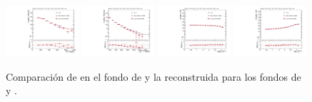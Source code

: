 \begin{figure}
  \centering
  \includegraphics[width=0.24\textwidth]{images/analysis_EWK/ZnunugCutS_100_vs_ZllgCutS_100_v192_0_met_et.pdf}
  \includegraphics[width=0.24\textwidth]{images/analysis_EWK/ZnunugCutS_100_vs_ZllgCutS_100_v192_0_ph_pt0.pdf}
  \includegraphics[width=0.24\textwidth]{images/analysis_EWK/ZnunugCutS_100_vs_ZllgCutS_100_v192_0_dphi_jetmet.pdf}
  \includegraphics[width=0.24\textwidth]{images/analysis_EWK/ZnunugCutS_100_vs_ZllgCutS_100_v192_0_dphi_gammet.pdf}
  \caption{Comparación de \met en el fondo de \znunuph y la reconstruida para los fondos de \zeeph y \zmumuph.}
  \label{fig:met_inv}
\end{figure}

